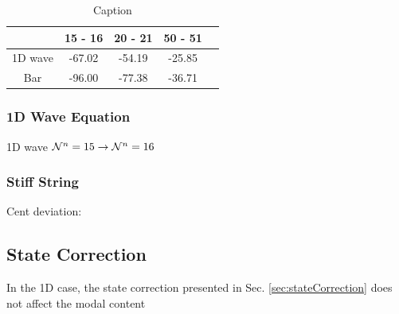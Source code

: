 \documentclass[fleqn]{jaes}
\begin{document}


\begin{table}[h]
    \centering
        \caption{Caption}

    \begin{tabular}{|c|c|c|c|c|}
        \hline & 15 - 16 & 20 - 21 & 50 - 51  \\\hline
        1D wave & -67.02 & -54.19 & -25.85 \\
        Bar & -96.00 & -77.38 & -36.71\\\hline
    \end{tabular}
    \label{tab:my_label}
\end{table}

\subsubsection{1D Wave Equation}

1D wave $\mathcal{N}^n = 15 \rightarrow \mathcal{N}^n = 16$ 

\subsubsection{Stiff String}

Cent deviation:

\subsection{State Correction}
In the 1D case, the state correction presented in Sec. \ref{sec:stateCorrection} does not affect the modal content 
\end{document}
